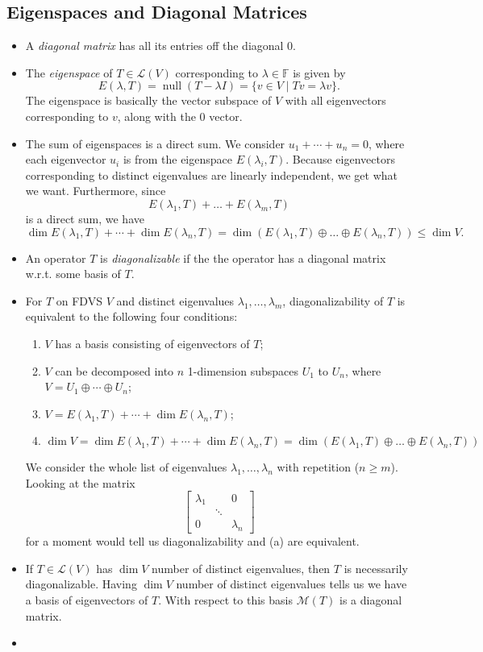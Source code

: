 \documentclass{article}
\newcommand{\F}{\mathbb{F}}
\newcommand{\n}{\operatorname{null}}
\renewcommand{\d}{\dim}
\newcommand{\LV}{\mathcal{L}(V)}
\newcommand{\M}{\mathcal{M}}
\begin{document}
\subsection{Eigenspaces and Diagonal Matrices}
\begin{itemize}
    \item A \textit{diagonal matrix} has all its entries off the diagonal 0.
    \item The \textit{eigenspace} of $T \in \LV$ corresponding to $\lambda \in \F$ is given by $$E(\lambda,T) = \n (T-\lambda I) = \{v \in V \mid Tv = \lambda v\}.$$
    The eigenspace is basically the vector subspace of $V$ with all eigenvectors corresponding to $v$, along with the 0 vector.
    \item The sum of eigenspaces is a direct sum. We consider $u_1+\cdots+u_n = 0$, where each eigenvector $u_i$ is from the eigenspace $E(\lambda_i,T)$. Because eigenvectors corresponding to distinct eigenvalues are linearly independent, we get what we want. Furthermore, since $$E(\lambda_1,T)+\dots+E(\lambda_m,T)$$ is a direct sum, we have $$\d E(\lambda_1,T) + \cdots + \d E(\lambda_n,T) = \d (E(\lambda_1,T) \oplus \dots \oplus E(\lambda_n,T)) \leq \d V.$$
    \item An operator $T$ is \textit{diagonalizable} if the the operator has a diagonal matrix w.r.t. some basis of $T$.
    \item For $T$ on FDVS $V$ and distinct eigenvalues $\lambda_1, \dots, \lambda_m$, diagonalizability of $T$ is equivalent to the following four conditions:
    \begin{enumerate}[label=(\alph*)]
        \item $V$ has a basis consisting of eigenvectors of $T$;
        \item $V$ can be decomposed into $n$ 1-dimension subspaces $U_1$ to $U_n$, where $V = U_1 \oplus \cdots \oplus U_n$;
        \item $V = E(\lambda_1,T) + \cdots + \d E(\lambda_n,T)$;
        \item $\d V = \d E(\lambda_1,T) + \cdots + \d E(\lambda_n,T) = \d (E(\lambda_1,T) \oplus \dots \oplus E(\lambda_n,T))$
    \end{enumerate}
    We consider the whole list of eigenvalues $\lambda_1, \dots, \lambda_n$ with repetition ($n \geq m$). Looking at the matrix
    \begin{equation*}
        \begin{bmatrix}
        \lambda_1 & & 0 \\
         & \ddots & \\
         0 & & \lambda_n
    \end{bmatrix}
    \end{equation*}
    for a moment would tell us diagonalizability and (a) are equivalent. 
    \item If $T \in \LV$ has $\d V$ number of distinct eigenvalues, then $T$ is necessarily diagonalizable. Having $\d V$ number of distinct eigenvalues tells us we have a basis of eigenvectors of $T$. With respect to this basis $\M(T)$ is a diagonal matrix.
    \item 
\end{itemize}
\end{document}
